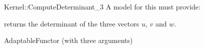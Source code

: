 \begin{ccRefFunctionObjectConcept}{Kernel::ComputeDeterminant_3}
A model for this must provide:


       {returns the determinant of the three vectors $u$, $v$ and $w$. }

\ccRefines
AdaptableFunctor (with three arguments)

\ccSeeAlso
{} \\
  \\

\end{ccRefFunctionObjectConcept}
